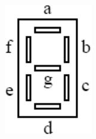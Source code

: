 \documentclass[10pt]{article}
\begin{document}
\begin{minipage}[c]{.15\linewidth}
\begin{center}
\includegraphics[width=.95\textwidth]{images/7segments}
\end{center}
\end{minipage} \hfill
\end{document}
